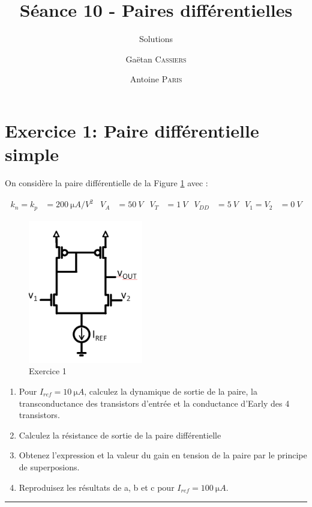 \documentclass[frenchb,DIV=14]{scrartcl}
\title{Séance 10 - Paires différentielles}
\subtitle{Solutions}
\author{\small Gaëtan \textsc{Cassiers} \and\small Antoine \textsc{Paris}}
\date{}
\begin{document}
\maketitle


\section*{Exercice 1: Paire différentielle simple}
On considère la paire différentielle de la Figure \ref{fig11-1} avec :

\begin{align*}
    k_n = k_p &= \SI{200}{\micro A/V^2} &
    V_A &= \SI{50}{V} &
    V_T &= \SI{1}{V} &
    V_{DD} &= \SI{5}{V} &
    V_1 = V_2 &= \SI{0}{V}
\end{align*}

\begin{figure}
    \centering
    \includegraphics[width=5cm]{figures/fig11-1.png}
    \caption{Exercice 1}
    \label{fig11-1}
\end{figure}

\begin{enumerate}
    \item  Pour $I_{ref}= \SI{10}{\micro A}$, calculez la dynamique de sortie de la paire, la transconductance des transistors d'entrée et la conductance d'Early des 4 transistors.
    \item  Calculez la résistance de sortie de la paire différentielle
    \item  Obtenez l'expression et la valeur du gain en tension de la paire par le principe de superposions.
    \item  Reproduisez les résultats de a, b et c pour $I_{ref}= \SI{100}{\micro A}$.
\end{enumerate}

\hspace{1cm}\hrule\hspace{1cm}
\end{document}
